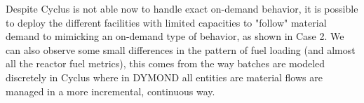 \documentclass[12pt]{article}
\begin{document}
Despite Cyclus is not able now to handle exact on-demand behavior, it is
possible to deploy the different facilities with limited capacities to
"follow" material demand to mimicking an on-demand type of behavior, as shown
in Case 2.  We can also observe some small differences in the pattern of fuel
loading (and almost all the reactor fuel metrics), this comes from the way
batches are modeled discretely in Cyclus where in DYMOND all entities are
material flows are managed in a more incremental, continuous way.






\end{document}
